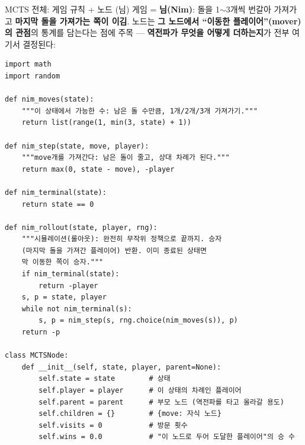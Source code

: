 \documentclass[aspectratio=169,11pt]{beamer}
\begin{document}
\begin{frame}[fragile]{MCTS 전체: 게임 규칙 + 노드 (님)}
  게임 = \textbf{님(Nim)}: 돌을 1$\sim$3개씩 번갈아 가져가고
  \textbf{마지막 돌을 가져가는 쪽이 이김}. 노드는
  \textbf{그 노드에서 ``이동한 플레이어''(mover)의 관점}의
  통계를 담는다는
  점에 주목 --- \textbf{역전파가 무엇을 어떻게 더하는지}가
  전부 여기서 결정된다:
\begin{lstlisting}
import math
import random

def nim_moves(state):
    """이 상태에서 가능한 수: 남은 돌 수만큼, 1개/2개/3개 가져가기."""
    return list(range(1, min(3, state) + 1))

def nim_step(state, move, player):
    """move개를 가져간다: 남은 돌이 줄고, 상대 차례가 된다."""
    return max(0, state - move), -player

def nim_terminal(state):
    return state == 0

def nim_rollout(state, player, rng):
    """시뮬레이션(롤아웃): 완전히 무작위 정책으로 끝까지. 승자
    (마지막 돌을 가져간 플레이어) 반환. 이미 종료된 상태면
    막 이동한 쪽이 승자."""
    if nim_terminal(state):
        return -player
    s, p = state, player
    while not nim_terminal(s):
        s, p = nim_step(s, rng.choice(nim_moves(s)), p)
    return -p

class MCTSNode:
    def __init__(self, state, player, parent=None):
        self.state = state        # 상태
        self.player = player      # 이 상태의 차례인 플레이어
        self.parent = parent      # 부모 노드 (역전파를 타고 올라갈 용도)
        self.children = {}        # {move: 자식 노드}
        self.visits = 0           # 방문 횟수
        self.wins = 0.0           # "이 노드로 두어 도달한 플레이어"의 승 수
\end{lstlisting}
\end{frame}
\end{document}
